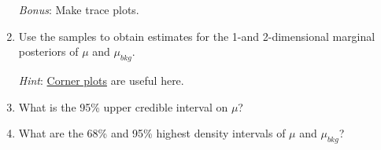 \documentclass{article}
\begin{document}
\begin{enumerate}
    \textit{Bonus}: Make trace plots.

    \item Use the samples to obtain estimates for the 1-and 2-dimensional marginal posteriors of $\mu$ and $\mu_{bkg}$.

    \textit{Hint}: \href{https://corner.readthedocs.io/en/latest/}{Corner plots} are useful here.

    \item What is the 95\% upper credible interval on $\mu$?

    \item What are the 68\% and 95\% highest density intervals of $\mu$ and $\mu_{bkg}$?
    

\end{enumerate}
\end{document}
